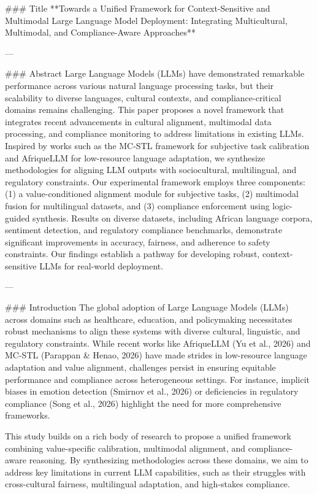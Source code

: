 ### Title  
**Towards a Unified Framework for Context-Sensitive and Multimodal Large Language Model Deployment: Integrating Multicultural, Multimodal, and Compliance-Aware Approaches**

---

### Abstract  
Large Language Models (LLMs) have demonstrated remarkable performance across various natural language processing tasks, but their scalability to diverse languages, cultural contexts, and compliance-critical domains remains challenging. This paper proposes a novel framework that integrates recent advancements in cultural alignment, multimodal data processing, and compliance monitoring to address limitations in existing LLMs. Inspired by works such as the MC-STL framework for subjective task calibration and AfriqueLLM for low-resource language adaptation, we synthesize methodologies for aligning LLM outputs with sociocultural, multilingual, and regulatory constraints. Our experimental framework employs three components: (1) a value-conditioned alignment module for subjective tasks, (2) multimodal fusion for multilingual datasets, and (3) compliance enforcement using logic-guided synthesis. Results on diverse datasets, including African language corpora, sentiment detection, and regulatory compliance benchmarks, demonstrate significant improvements in accuracy, fairness, and adherence to safety constraints. Our findings establish a pathway for developing robust, context-sensitive LLMs for real-world deployment.

---

### Introduction  
The global adoption of Large Language Models (LLMs) across domains such as healthcare, education, and policymaking necessitates robust mechanisms to align these systems with diverse cultural, linguistic, and regulatory constraints. While recent works like AfriqueLLM (Yu et al., 2026) and MC-STL (Parappan & Henao, 2026) have made strides in low-resource language adaptation and value alignment, challenges persist in ensuring equitable performance and compliance across heterogeneous settings. For instance, implicit biases in emotion detection (Smirnov et al., 2026) or deficiencies in regulatory compliance (Song et al., 2026) highlight the need for more comprehensive frameworks.

This study builds on a rich body of research to propose a unified framework combining value-specific calibration, multimodal alignment, and compliance-aware reasoning. By synthesizing methodologies across these domains, we aim to address key limitations in current LLM capabilities, such as their struggles with cross-cultural fairness, multilingual adaptation, and high-stakes compliance.

